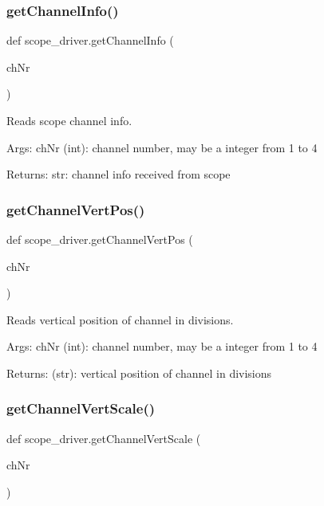 \subsubsection{\texorpdfstring{get\+Channel\+Info()}{getChannelInfo()}}
{\footnotesize\ttfamily def scope\+\_\+driver.\+get\+Channel\+Info (\begin{DoxyParamCaption}\item[{}]{ch\+Nr }\end{DoxyParamCaption})}

\begin{DoxyVerb}Reads scope channel info.

Args:
    chNr (int): channel number, may be a integer from 1 to 4
    
Returns:
    str: channel info received from scope\end{DoxyVerb}
 \mbox{\label{namespacescope__driver_a3015b914ca2cd61b10e0ef00267dbb5c}} 
\subsubsection{\texorpdfstring{get\+Channel\+Vert\+Pos()}{getChannelVertPos()}}
{\footnotesize\ttfamily def scope\+\_\+driver.\+get\+Channel\+Vert\+Pos (\begin{DoxyParamCaption}\item[{}]{ch\+Nr }\end{DoxyParamCaption})}

\begin{DoxyVerb}Reads vertical position of channel in divisions.

Args:
    chNr (int): channel number, may be a integer from 1 to 4

Returns:
    (str): vertical position of channel in divisions
\end{DoxyVerb}
 \mbox{\label{namespacescope__driver_adbdbb48ea81dbe1c65192cf395408853}} 
\subsubsection{\texorpdfstring{get\+Channel\+Vert\+Scale()}{getChannelVertScale()}}
{\footnotesize\ttfamily def scope\+\_\+driver.\+get\+Channel\+Vert\+Scale (\begin{DoxyParamCaption}\item[{}]{ch\+Nr }\end{DoxyParamCaption})}

